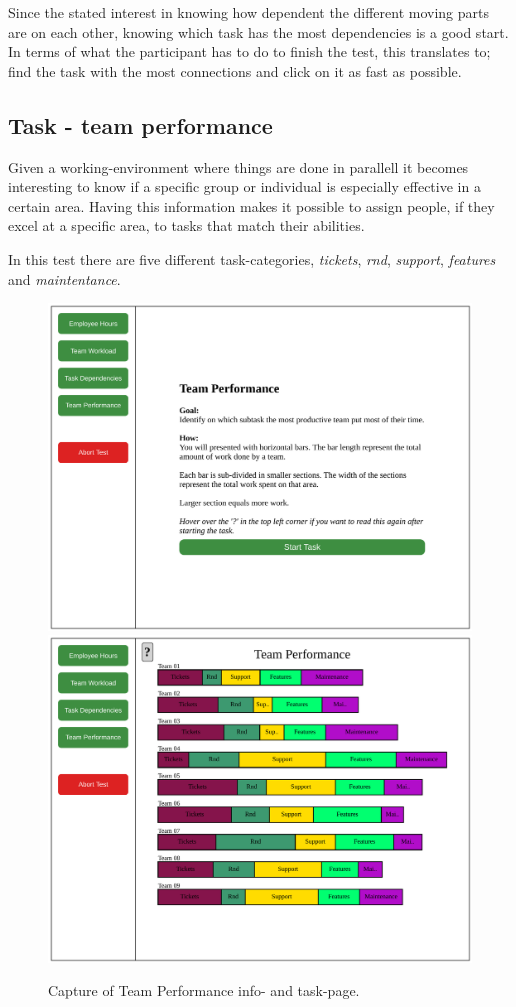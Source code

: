 \documentclass[nofilelist,dvipsnames]{cslthse-msc}
\begin{document}
{        Since the stated interest in knowing how dependent the different
        moving parts are on each other, knowing which task has the most
        dependencies is a good start. In terms of what the participant has to
        do to finish the test, this translates to; find the task with the most
        connections and click on it as fast as possible.

        \subsection{Task - team performance}

        \textit{\ideaFour}

        Given a working-environment where things are done in parallell it
        becomes interesting to know if a specific group or individual is
        especially effective in a certain area. Having this information makes
        it possible to assign people, if they excel at a specific area, to
        tasks that match their abilities.

        In this test there are five different task-categories,
        \textit{tickets},
        \textit{rnd},
        \textit{support},
        \textit{features} and
        \textit{maintentance}.

        \begin{figure}[h!]
          \centering
          \includegraphics[width=.49\textwidth]{figures/captures/webapp_team_performance_info.pdf}
          \includegraphics[width=.49\textwidth]{figures/captures/webapp_team_performance_task.pdf}
          \caption{Capture of Team Performance info- and task-page.}
        \end{figure}

}
\end{document}
